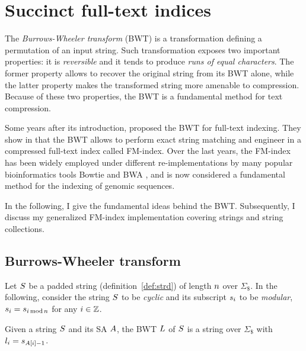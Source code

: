 \section{Succinct full-text indices}

The \emph{Burrows-Wheeler transform} (BWT) \citep{Burrows1994} is a transformation defining a permutation of an input string.
Such transformation exposes two important properties: it is \emph{reversible} and it tends to produce \emph{runs of equal characters}.
The former property allows to recover the original string from its BWT alone, while the latter property makes the transformed string more amenable to compression.
Because of these two properties, the BWT is a fundamental method for text compression.

Some years after its introduction, \citeauthor{Ferragina2000} proposed the BWT for full-text indexing.
They show in \citep{Ferragina2000} that the BWT allows to perform exact string matching and engineer in \citep{Ferragina2001} a compressed full-text index called FM-index.
Over the last years, the FM-index has been widely employed under different re-implementations by many popular bioinformatics tools \eg Bowtie \citep{Langmead2009} and BWA \citep{Li2009}, and is now considered a fundamental method for the indexing of genomic sequences.

In the following, I give the fundamental ideas behind the BWT.
Subsequently, I discuss my generalized FM-index implementation covering strings and string collections.

\subsection{Burrows-Wheeler transform}
\label{sec:index:bwt}

Let $S$ be a padded string (definition~\ref{def:strd}) of length $n$ over $\Sigma_{\$}$.
In the following, consider the string $S$ to be \emph{cyclic} and its subscript $\Subscript{\String}{i}$ to be \emph{modular}, \ie $\Subscript{\String}{i} = \Subscript{\String}{i \imod{\Slen}}$ for any $i \in \mathbb {Z}$.
\begin{definition}[BWT]
\label{def:bwt}
Given a string $S$ and its SA $A$, the BWT $L$ of $S$ is a string over $\Sigma_{\$}$ with $\Subscript{\Last}{i}=\Subscript{\String}{\SubscriptNV{\Sarray}{i}-1}$.
\end{definition}

